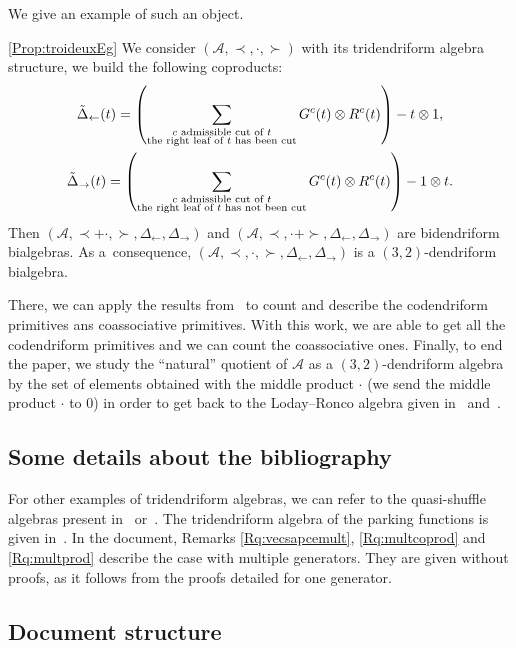 \documentclass[pdftex]{sigma}
\numberwithin{equation}{section}
\theoremstyle{definition}
\theoremstyle{plain}
\begin{document}
We give an example of such an object.
\begin{customprop}{\ref{Prop:troideuxEg}}
	We consider $(\mathcal{A},\prec,\cdot,\succ)$ with its tridendriform algebra structure, we build the following coproducts:
	\begin{gather*}
		\tilde{\Delta}_{\leftarrow}(t)=\left(\sum_{\substack{\text{\rm $c$ admissible cut of $t$} \\ \text{\rm the right leaf of $t$ has been cut}}} G^c(t)\otimes R^c(t)\right)-t\otimes 1, \\
		\tilde{\Delta}_{\rightarrow}(t)=\left(\sum_{\substack{\text{\rm $c$ admissible cut of $t$} \\ \text{\rm the right leaf of $t$ has not been cut}}} G^c(t)\otimes R^c(t)\right)-1\otimes t.
	\end{gather*}
Then $(\mathcal{A},\prec+\cdot,\succ,\Delta_{\leftarrow},\Delta_{\rightarrow})$ and $(\mathcal{A},\prec,\cdot+\succ,\Delta_{\leftarrow},\Delta_{\rightarrow})$ are bidendriform bialgebras. As a~consequence, $(\mathcal{A},\prec,\cdot,\succ,\Delta_{\leftarrow},\Delta_{\rightarrow})$ is a $(3,2)$-dendriform bialgebra.
\end{customprop}
There, we can apply the results from~\cite{bidend} to count and describe the codendriform primitives ans coassociative primitives. With this work, we are able to get all the codendriform primitives and we can count the coassociative ones. Finally, to end the paper, we study the ``natural'' quotient of $\mathcal{A}$ as a $(3,2)$-dendriform algebra by the set of elements obtained with the middle product $\cdot$ (we send the middle product $\cdot$ to $0$) in order to get back to the Loday--Ronco algebra given in~\cite{LR} and~\cite{AgLR}.

\subsection*{Some details about the bibliography}

 For other examples of tridendriform algebras, we can refer to the quasi-shuffle algebras present in~\cite{batc2, batc} or~\cite{batc3}. The tridendriform algebra of the parking functions is given in~\cite{Tridend}.
 In the document, Remarks \ref{Rq:vecsapcemult}, \ref{Rq:multcoprod} and \ref{Rq:multprod} describe the case with multiple generators. They are given without proofs, as it follows from the proofs detailed for one generator.

\subsection*{Document structure}
\end{document}
